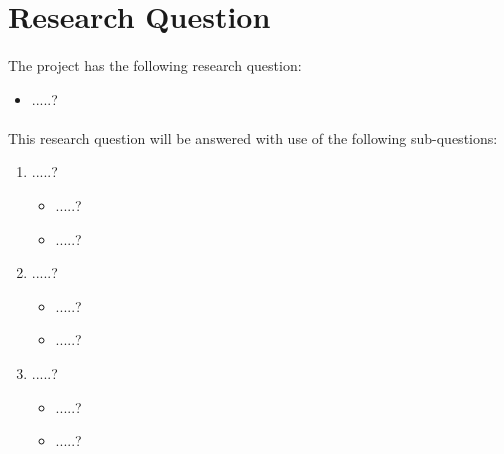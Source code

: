 \section{Research Question}
\paragraph{}
The project has the following research question:
\begin{itemize}
	\item .....?
\end{itemize}

\paragraph{}
This research question will be answered with use of the following sub-questions:
\begin{enumerate}
    \item .....?
    \begin{itemize}
        \item .....?
        \item .....?
    \end{itemize}
    \item .....?
    \begin{itemize}
        \item .....?
        \item .....?
    \end{itemize}
    \item .....?
    \begin{itemize}
        \item .....?
        \item .....?
    \end{itemize}
\end{enumerate}

